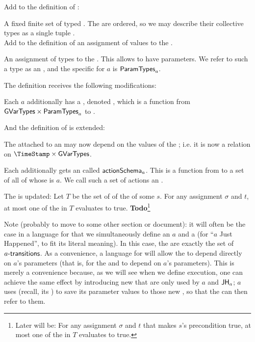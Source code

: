 \documentclass[12pt]{article}
\begin{document}
Add to the definition of \Contract:
\begin{LPPI}
\item A fixed finite set of typed \GVars. The \GVars are ordered, so we may describe their collective types as a single tuple \GVarTypes. \\
 Add to the definition of \GlobalState an assignment of values to the \GVars.

\item An assignment of types to the \Actions. This allows \Events to have parameters. We refer to such a type as an \AParamsDomain, and the specific \AParamsDomain for \Action $a$ is $\textsf{ParamTypes}_{a}$.
\end{LPPI}

\noindent The \Event definition receives the following modifications:
\begin{LPPI}
\item Each \Action $a$ additionally has a \GStateTransform, denoted , which is a function from $\text{{\sf GVarTypes}} \times \textsf{ParamTypes}_{a}$ to \GVarTypes. 
\item And the definition of  is extended:
\begin{LPPI}
\item The \TGuard attached to an  may now depend on the values of the \GVars; i.e. it is now a relation on $\TimeStamp \times \text{\GVarTypes}$.
\item Each  additionally gets an \ASConstructor called $\textsf{actionSchema}_{a}$. This is a function from \GVarTypes to a set of \Events all of whose \Action is $a$. We call such a set of actions an  \ActionSchema. 
\end{LPPI}
\end{LPPI}

\noindent The \uaoc is updated: Let $T$ be the set of \TGuards of the \mustntrans of some \State $s$. For any \GVars assignment $\sigma$ and \TimeStamp $t$, at most one of the \TGuards in $T$ evaluates to true. {\bf Todo}\footnote{Later will be: For any \GVars assignment $\sigma$ and \TimeStamp $t$ that makes $s$'s precondition true, at most one of the \TGuards in $T$ evaluates to true.}


\bigskip

Note (probably to move to some other section or document): it will often be the case in a language for \Contracts that we simultaneously define an \Action $a$ and a \State {} (for ``$a$ Just Happened'', to fit its literal meaning). In this case, the  are exactly the set of $a\textsf{-transitions}$. As a convenience, a language for \Contracts will allow the  to depend directly on $a$'s parameters (that is, for the \TGuard and \ASConstructor to depend on $a$'s parameters). This is merely a convenience because, as we will see when we define execution, one can achieve the same effect by introducing new \GVars that are only used by $a$ and $\textsf{JH}_{a}$; $a$ uses  (recall, its \GStateTransform) to save its parameter values to those new \GVars, so that the  can then refer to them.
\end{document}
